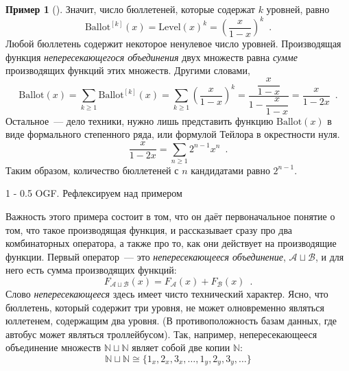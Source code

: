 \documentclass{article}
\makeatletter
\theoremstyle{definition}
\newtheorem{example}{Пример}
\renewcommand{\subsection}{\@startsection
{subsection}%
{1}%
{\z@}%
{-\baselineskip}%
{0.5\baselineskip}%
{\centering\large\scshape}} %
\makeatother
\begin{document}
\begin{example}[{\cite[Example 10, p.36]{species}}]
Значит, число бюллетеней, которые содержат \( k \) уровней, равно
\[
	\mathrm{Ballot}^{[k]}(x) = \mathrm{Level}(x)^{k} = 
	\left(\dfrac{x}{1-x}\right)^k \enspace .
\]
Любой бюллетень содержит некоторое ненулевое число уровней. Производящая 
функция \textit{непересекающегося объединения} двух множеств равна 
\textit{сумме} производящих функций этих множеств. Другими словами,
\[
	\mathrm{Ballot}(x) = \sum_{k \geq 1} \mathrm{Ballot}^{[k]}(x) = \sum_{k 
	\geq 1} \left(\dfrac{x}{1-x}\right)^k = \dfrac{\dfrac{x}{1-x}}{1 - 
	\dfrac{x}{1 - x}} 
	= \dfrac{x}{1 - 2x}
	\enspace .
\]
Остальное~--- дело техники, нужно лишь представить функцию \( 
\mathrm{Ballot}(x) \) в виде формального степенного ряда, или формулой Тейлора 
в окрестности нуля.
\[
	\dfrac{x}{1 - 2x} = \sum_{n \geq 1} 2^{n-1} 
	x^n \enspace .
\]
Таким образом, количество бюллетеней с \( n \) кандидатами равно \( 2^{n-1} \).
\end{example}

\subsection{OGF. Рефлексируем над примером}

Важность этого примера состоит в том, что он даёт первоначальное понятие о том, 
что такое производящая функция, и рассказывает сразу про два 
комбинаторных оператора, а также про то, как они действует на производящие 
функции. Первый оператор~--- это \textit{непересекающееся объединение}, \( 
\mathcal A 
\sqcup \mathcal B \), и для него есть сумма производящих функций:
\[
	F_{\mathcal A \sqcup \mathcal B}(x) = F_{\mathcal A}(x) + F_{\mathcal B}(x) 
	\enspace .
\]
Слово \textit{непересекающееся} здесь имеет чисто технический характер. Ясно, 
что бюллетень, который содержит три уровня, не может олновременно являться 
юллетенем, содержащим два уровня. (В противоположность базам данных, где 
автобус может являться троллейбусом). Так, например, непересекающееся 
объединение множеств \( \mathbb N \sqcup \mathbb N \) являет собой две копии \( 
\mathbb N \):
\[
	\mathbb N \sqcup \mathbb N \cong
	\{
		1_x, 2_x, 3_x, \ldots,
		1_y, 2_y, 3_y, \ldots
	\}
\]
\end{document}
